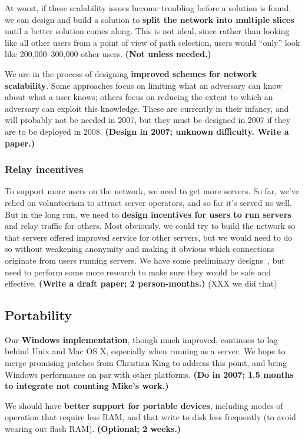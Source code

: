 \documentclass{article}
\newcommand{\plan}[1]{ {\bf (#1)}}
\begin{document}
At worst, if these scalability issues become troubling before a solution is
found, we can design and build a solution to {\bf split the network into
multiple slices} until a better solution comes along.  This is not ideal,
since rather than looking like all other users from a point of view of path
selection, users would ``only'' look like 200,000--300,000 other
users.\plan{Not unless needed.}

We are in the process of designing {\bf improved schemes for network
  scalability}.  Some approaches focus on limiting what an adversary can know
about what a user knows; others focus on reducing the extent to which an
adversary can exploit this knowledge.  These are currently in their infancy,
and will probably not be needed in 2007, but they must be designed in 2007 if
they are to be deployed in 2008.\plan{Design in 2007; unknown difficulty.
  Write a paper.}

\subsubsection{Relay incentives}
To support more users on the network, we need to get more servers.  So far,
we've relied on volunteerism to attract server operators, and so far it's
served us well.  But in the long run, we need to {\bf design incentives for
  users to run servers} and relay traffic for others.  Most obviously, we
could try to build the network so that servers offered improved service for
other servers, but we would need to do so without weakening anonymity and
making it obvious which connections originate from users running servers.  We
have some preliminary designs~\cite{incentives-txt,tor-challenges},
but need to perform
some more research to make sure they would be safe and effective.\plan{Write
  a draft paper; 2 person-months.}
(XXX we did that)

\subsection{Portability}
Our {\bf Windows implementation}, though much improved, continues to lag
behind Unix and Mac OS X, especially when running as a server.  We hope to
merge promising patches from Christian King to address this point, and bring
Windows performance on par with other platforms.\plan{Do in 2007; 1.5 months
  to integrate not counting Mike's work.}

We should have {\bf better support for portable devices}, including modes of
operation that require less RAM, and that write to disk less frequently (to
avoid wearing out flash RAM).\plan{Optional; 2 weeks.}
\end{document}
